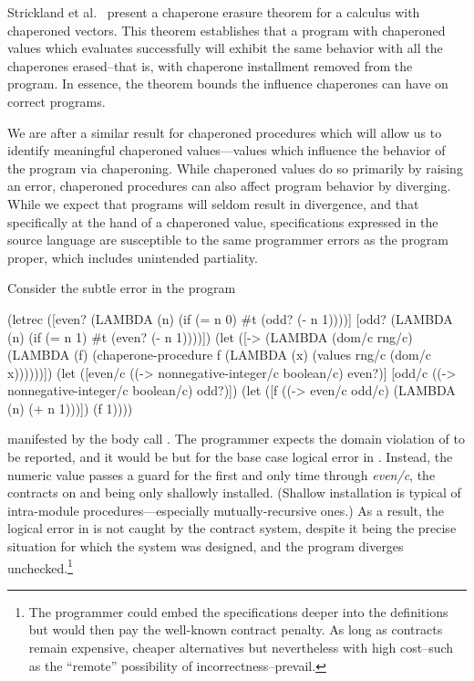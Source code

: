 Strickland et al.~\cite{strickland2012chaperones} present a chaperone erasure theorem for a calculus with chaperoned vectors.
This theorem establishes that a program with chaperoned values which evaluates successfully will exhibit the same behavior with all the chaperones erased--that is, with chaperone installment removed from the program.
In essence, the theorem bounds the influence chaperones can have on correct programs.

We are after a similar result for chaperoned procedures which will allow us to identify meaningful chaperoned values---values which influence the behavior of the program via chaperoning.
While chaperoned values do so primarily by raising an error, chaperoned procedures can also affect program behavior by diverging.
While we expect that programs will seldom result in divergence, and that specifically at the hand of a chaperoned value, specifications expressed in the source language are susceptible to the same programmer errors as the program proper, which includes unintended partiality.

Consider the subtle error in the program
\begin{schemedisplay}
(letrec ([even? (LAMBDA (n)
                (if (= n 0)
                      #t
                      (odd? (- n 1))))]
         [odd? (LAMBDA (n)
                 (if (= n 1)
                     #t
                     (even? (- n 1))))])
  (let ([-> (LAMBDA (dom/c rng/c)
              (LAMBDA (f) (chaperone-procedure
                           f
                           (LAMBDA (x) (values rng/c (dom/c x))))))])
    (let ([even/c ((-> nonnegative-integer/c boolean/c) even?)]
          [odd/c  ((-> nonnegative-integer/c boolean/c) odd?)])
      (let ([f ((-> even/c odd/c) (LAMBDA (n) (+ n 1)))])
        (f 1))))
\end{schemedisplay}
manifested by the body call .
The programmer expects the domain violation of  to be reported, and it would be but for the base case logical error in .
Instead, the numeric value passes a guard for the first and only time through \emph{even/c}, the contracts on  and  being only shallowly installed.
(Shallow installation is typical of intra-module procedures---especially mutually-recursive ones.)
As a result, the logical error in  is not caught by the contract system, despite it being the precise situation for which the system was designed, and the program diverges unchecked.\footnote{The programmer could embed the specifications deeper into the definitions but would then pay the well-known contract penalty.
As long as contracts remain expensive, cheaper alternatives but nevertheless with high cost--such as the ``remote'' possibility of incorrectness--prevail.}

